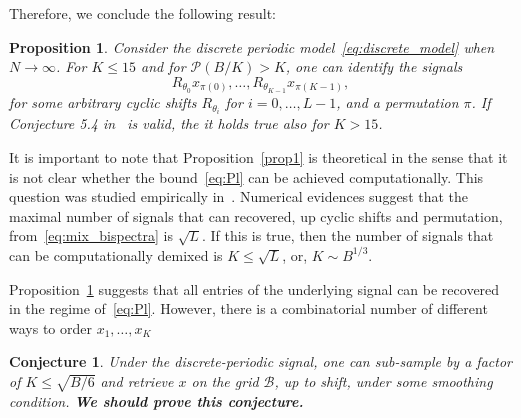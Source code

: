 \documentclass[english,12pt]{article}
\numberwithin{equation}{section}
\newtheorem{conj}{Conjecture}
\newtheorem{prop}{Proposition}
\begin{document}
Therefore, we conclude the following result:
\begin{prop} \label{prop1}
Consider the  discrete periodic model~\eqref{eq:discrete_model} when $N\to\infty$. 
For $K\leq 15$ and for $\mathcal{P}(B/K)>K$, one can identify the signals 
\begin{equation} \label{eq:set_signals}
R_{\theta_0}x_{\pi(0)}, \ldots,R_{\theta_{K-1}}x_{\pi(K-1)},
\end{equation}
for some arbitrary cyclic shifts $R_{\theta_i}$ for $i=0,\ldots,L-1$, and a permutation $\pi$.
If Conjecture 5.4 in~\cite{bandeira2017estimation} is valid, the it holds true also for $K>15$.
\end{prop}	

It is important to note that Proposition~\eqref{prop1} is theoretical in the sense that it is not clear whether the bound~\eqref{eq:Pl} can be achieved computationally.  
This question was studied empirically in~\cite{boumal2018heterogeneous}. Numerical evidences suggest that the maximal number of signals that can recovered, up cyclic shifts and permutation, from~\eqref{eq:mix_bispectra} is $\sqrt{L}$. If this is true, then the number of signals that can be computationally 
demixed is $K\leq \sqrt{L}$, or, $K\sim B^{1/3}$. 

Proposition~\ref{prop1} suggests that all entries of the underlying signal can be recovered in the regime of~\eqref{eq:Pl}. However, there is a combinatorial number of different ways to order $x_1,\ldots,x_K$ 

\begin{conj} \label{conj1}
	Under the discrete-periodic signal, one can sub-sample by a factor of  	$K\leq \sqrt{B/6}$ and retrieve  $x$ on the grid $\mathcal{B}$, up to shift, under some smoothing condition. \textbf{We should prove this conjecture.}
\end{conj}	
\end{document}
